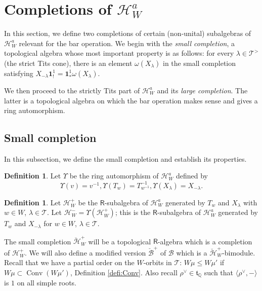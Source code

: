 \documentclass{amsart}
\newcommand{\Hecke}{\mathcal{H}}
\newcommand{\Ring}{\mathsf{R}}
\newcommand{\bone}{\mathbf{1}}
\newcommand{\Ha}{\mathcal{H}_{W}^a}
\newcommand{\B}{\mathcal{B}}
\theoremstyle{definition}
\newtheorem{defi}[Thm]{Definition}
\numberwithin{equation}{section}
\begin{document}
\section{Completions of $\mathcal{H}_W^a$}\label{sec:completions}

In this section, we define two completions of certain (non-unital) subalgebras of $\Ha$ relevant for the bar operation. We begin with the \emph{small completion}, a topological algebra whose most important property is as follows: for every $\lambda\in \mathcal{T}^>$ (the strict Tits cone), there is an element $\omega(X_\lambda)$ in the small completion satisfying $X_{-\lambda} \bone^1_!=\bone^1_* \omega(X_\lambda)$.

We then proceed to the strictly Tits part of $\mathcal{H}^a_W$ and its \emph{large completion}. The latter is a topological algebra on which the bar operation makes sense and gives a ring automorphism.

\subsection{Small completion}
In this subsection, we define the small completion and establish its properties.

\begin{defi}
    Let $\Upsilon$ be the ring automorphism of $\Ha$ defined by $$\Upsilon(v)=v^{-1}, \Upsilon(T_w)=T^{-1}_{w^{-1}},\Upsilon(X_\lambda)=X_{-\lambda}.$$
\end{defi}


\begin{defi}
    Let $\Hecke_W^+$ be the $\Ring$-subalgebra of $\Ha$ generated by $T_w$ and $X_\lambda$ with $w \in W$, $\lambda\in \mathcal{T}$. Let $\Hecke_W^-=\Upsilon(\Hecke_W^+)$; this is the $\Ring$-subalgebra of $\Ha$ generated by $T_w$ and $X_{-\lambda}$ for $w \in W$, $\lambda\in \mathcal{T}$.
\end{defi}

The small completion ${\breve{\Hecke}}_W^+$ will be a topological $\Ring$-algebra which is a completion of $\Hecke_W^+$. We will also define a modified version
$\breve{\B}^+$ of $\mathcal{B}$ which is a $\breve{\Hecke}_W^+$-bimodule. Recall that we have a partial order on the $W$-orbits in $\mathcal{T}$: $W\mu\leqslant W\mu'$ if $W\mu\subset \operatorname{Conv}(W\mu')$,
Definition \ref{defi:Conv}. Also recall $\rho^\vee\in \mathfrak{t}_{\mathbb{Q}}$ such that $\langle\rho^\vee,-\rangle$ is $1$ on all simple roots.

\end{document}
